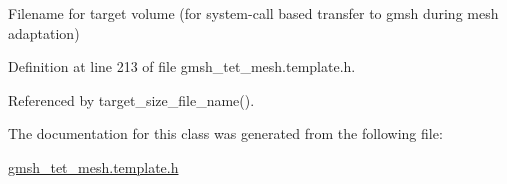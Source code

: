 Filename for target volume (for system-\/call based transfer to gmsh during mesh adaptation) 



Definition at line 213 of file gmsh\+\_\+tet\+\_\+mesh.\+template.\+h.



Referenced by target\+\_\+size\+\_\+file\+\_\+name().



The documentation for this class was generated from the following file\+:\begin{DoxyCompactItemize}
\item 
\hyperlink{gmsh__tet__mesh_8template_8h}{gmsh\+\_\+tet\+\_\+mesh.\+template.\+h}\end{DoxyCompactItemize}
